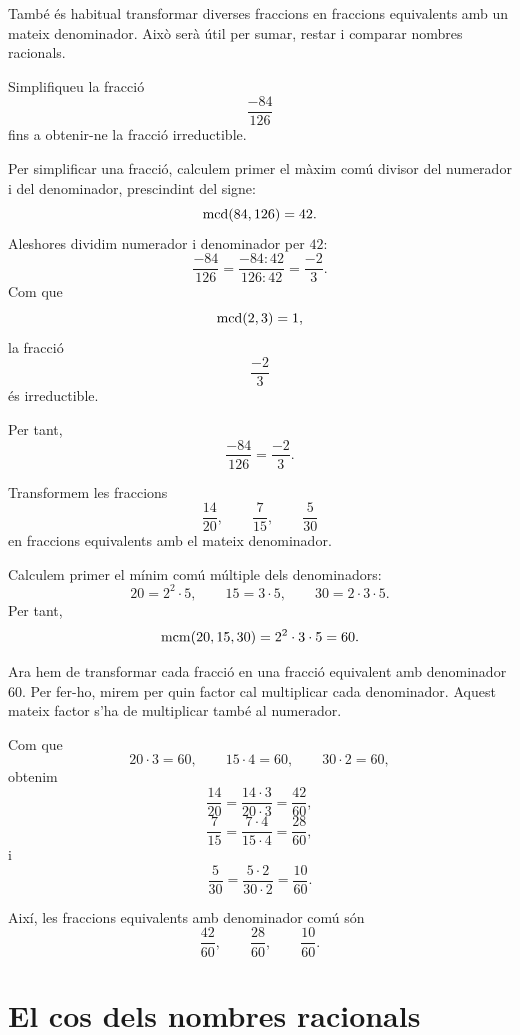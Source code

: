 També és habitual transformar diverses fraccions en fraccions equivalents amb un mateix denominador. Això serà útil per sumar, restar i comparar nombres racionals.

\begin{exemple}
	Simplifiqueu la fracció
	\[
	\frac{-84}{126}
	\]
	fins a obtenir-ne la fracció irreductible.
\end{exemple}

\begin{solucio}
	Per simplificar una fracció, calculem primer el màxim comú divisor del numerador i del denominador, prescindint del signe:
	\[
	\operatorname{mcd}(84,126)=42.
	\]
	Aleshores dividim numerador i denominador per \(42\):
	\[
	\frac{-84}{126}
	=
	\frac{-84:42}{126:42}
	=
	\frac{-2}{3}.
	\]
	Com que
	\[
	\operatorname{mcd}(2,3)=1,
	\]
	la fracció
	\[
	\frac{-2}{3}
	\]
	és irreductible.
	
	Per tant,
	\[
	\frac{-84}{126}=\frac{-2}{3}.
	\]
\end{solucio}

\begin{exemple}
	Transformem les fraccions
	\[
	\frac{14}{20},
	\qquad
	\frac{7}{15},
	\qquad
	\frac{5}{30}
	\]
	en fraccions equivalents amb el mateix denominador.
\end{exemple}

\begin{solucio}
	Calculem primer el mínim comú múltiple dels denominadors:
	\[
	20=2^2\cdot5,
	\qquad
	15=3\cdot5,
	\qquad
	30=2\cdot3\cdot5.
	\]
	Per tant,
	\[
	\operatorname{mcm}(20,15,30)=2^2\cdot3\cdot5=60.
	\]
	
	Ara hem de transformar cada fracció en una fracció equivalent amb denominador \(60\). Per fer-ho, mirem per quin factor cal multiplicar cada denominador. Aquest mateix factor s'ha de multiplicar també al numerador.
	
	Com que
	\[
	20\cdot3=60,
	\qquad
	15\cdot4=60,
	\qquad
	30\cdot2=60,
	\]
	obtenim
	\[
	\frac{14}{20}
	=
	\frac{14\cdot3}{20\cdot3}
	=
	\frac{42}{60},
	\]
	\[
	\frac{7}{15}
	=
	\frac{7\cdot4}{15\cdot4}
	=
	\frac{28}{60},
	\]
	i
	\[
	\frac{5}{30}
	=
	\frac{5\cdot2}{30\cdot2}
	=
	\frac{10}{60}.
	\]
	
	Així, les fraccions equivalents amb denominador comú són
	\[
	\frac{42}{60},
	\qquad
	\frac{28}{60},
	\qquad
	\frac{10}{60}.
	\]
\end{solucio}


\section{El cos dels nombres racionals}

